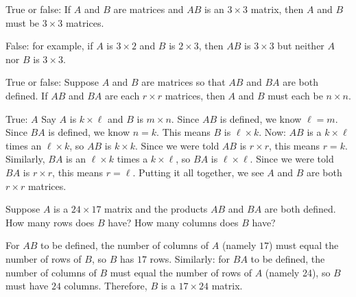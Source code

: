 \begin{problems}
  \problem %
  True or false: If $A$ and $B$ are matrices and $AB$ is an $3 \times 3$ matrix,
  then $A$ and $B$ must be $3 \times 3$ matrices.
  
\begin{solution}
  False: for example, if $A$ is $3 \times 2$ and $B$ is $2 \times 3$, then $AB$
  is $3 \times 3$ but neither $A$ nor $B$ is $3 \times 3$.
\end{solution}

\problem %
True or false: Suppose $A$ and $B$ are matrices so that $AB$ and $BA$ are both
defined.  If $AB$ and $BA$ are each $r \times r$ matrices, then $A$ and $B$ must
each be $n \times n$.

\begin{solution}
  True: $A$ Say $A$ is $k \times \ell$ and $B$ is $m \times n$.  Since $AB$ is
  defined, we know $\ell = m$.  Since $BA$ is defined, we know $n = k$.  This
  means $B$ is $\ell \times k$.  \newline \newline %
  Now: $AB$ is a $k \times \ell$ times an $\ell \times k$, so $AB$ is
  $k \times k$.  Since we were told $AB$ is $r \times r$, this means $r =
  k$. \newline \newline %
  Similarly, $BA$ is an $\ell \times k$ times a $k \times \ell$, so $BA$ is
  $\ell \times \ell$.  Since we were told $BA$ is $r \times r$, this means $r = \ell$.
  \newline \newline %
  Putting it all together, we see $A$ and $B$ are both $r \times r$ matrices.
  
\end{solution}


\problem %
Suppose $A$ is a $24 \times 17$ matrix and the products $AB$ and $BA$ are both
defined.  How many rows does $B$ have?  How many columns does $B$ have?

\begin{solution}
  For $AB$ to be defined, the number of columns of $A$ (namely $17$) must equal
  the number of rows of $B$, so $B$ has $17$ rows. \newline \newline Similarly:
  for $BA$ to be defined, the number of columns of $B$ must equal the number of
  rows of $A$ (namely 24), so $B$ must have $24$ columns. \newline \newline
  Therefore, $B$ is a $17 \times 24$ matrix.
\end{solution}


\end{problems}
